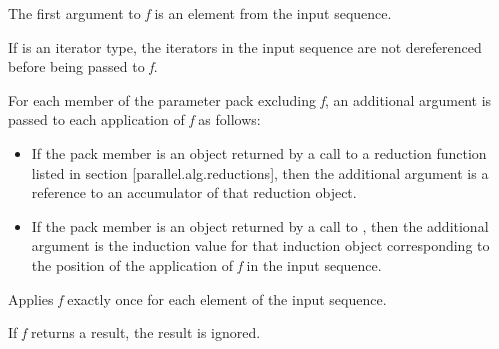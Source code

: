 \begin{itemdescr}
The first argument to {\em f} is an element from the input sequence.\begin{note}If  is an iterator type, the iterators in the input sequence are not dereferenced before being passed to {\em f}.\end{note} For each member of the  parameter pack excluding {\em f}, an additional argument is passed to each application of {\em f} as follows:

\begin{itemize}
\item If the pack member is an object returned by a call to a reduction function listed in section [parallel.alg.reductions], then the additional argument is a reference to an accumulator of that reduction object.

\item If the pack member is an object returned by a call to , then the additional argument is the induction value for that induction object corresponding to the position of the application of {\em f} in the input sequence.
\end{itemize}

\pnum \complexity Applies {\em f} exactly once for each element of the input sequence.

\pnum \remarks If {\em f} returns a result, the result is ignored.

\end{itemdescr}
